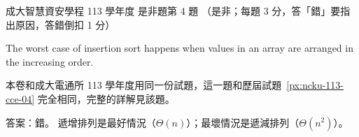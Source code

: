 \begin{pastexam}[label={px:ncku-113-isec-04}]{成大智慧資安學程 113 學年度 是非題第 4 題}
（是非；每題 3 分，答「錯」要指出原因，答錯倒扣 1 分）

The worst case of insertion sort happens when values in an array are arranged in the
increasing order.
\end{pastexam}

\begin{pastsoln}
本卷和成大電通所 113 學年度用同一份試題，這一題和歷屆試題~\ref{px:ncku-113-cce-04} 完全相同，完整的詳解見該題。

答案：錯。 遞增排列是最好情況（$\Theta(n)$）；最壞情況是遞減排列（$\Theta(n^2)$）。
\end{pastsoln}
